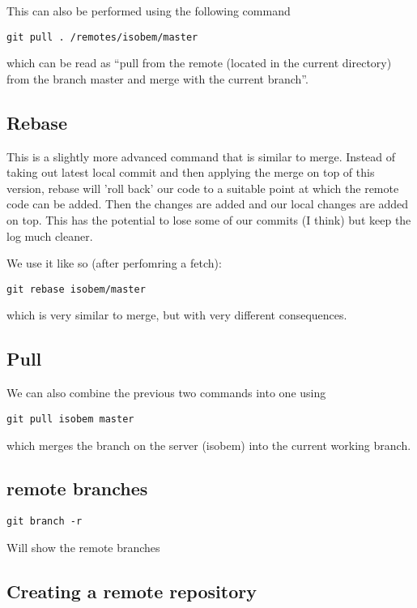 \documentclass[a4paper, 10pt]{article}
\begin{document}
This can also be performed using the following command
\begin{verbatim}
git pull . /remotes/isobem/master
\end{verbatim}
which can be read as ``pull from the remote (located in the current
directory) from the branch master and merge with the current branch''.

\subsection*{Rebase}
\label{sec:rebase}

This is a slightly more advanced command that is similar to
merge. Instead of taking out latest local commit and then applying the
merge on top of this version, rebase will 'roll back' our code to a
suitable point at which the remote code can be added. Then the changes
are added and our local changes are added on top. This has the
potential to lose some of our commits (I think) but keep the log much
cleaner.

We use it like so (after perfomring a fetch):
\begin{verbatim}
git rebase isobem/master
\end{verbatim}
which is very similar to merge, but with very different consequences. 


\subsection*{Pull}
\label{sec:pull}

We can also combine the previous two commands into one using 
\begin{verbatim}
git pull isobem master
\end{verbatim}
which merges the branch on the server (isobem) into the current
working branch. 


\subsection*{remote branches}
\begin{Verbatim}
git branch -r
\end{Verbatim}
Will show the remote branches


\subsection{Creating a remote repository}
\label{sec:creat-remote-repos}
\end{document}
